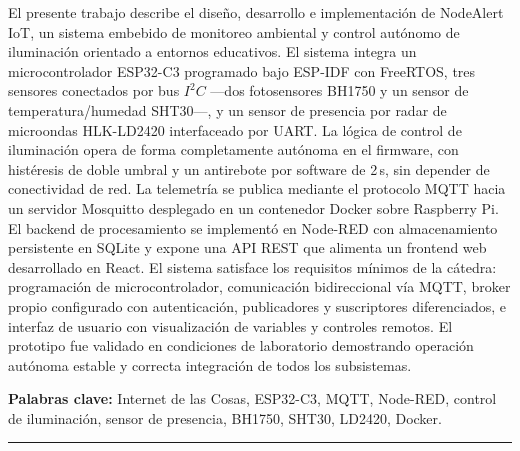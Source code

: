 

\noindent
El presente trabajo describe el diseño, desarrollo e implementación de NodeAlert IoT,
un sistema embebido de monitoreo ambiental y control autónomo de iluminación orientado
a entornos educativos. El sistema integra un microcontrolador ESP32-C3 programado bajo
ESP-IDF con FreeRTOS, tres sensores conectados por bus \(I^2C\) —dos fotosensores BH1750
y un sensor de temperatura/humedad SHT30—, y un sensor de presencia por radar de
microondas HLK-LD2420 interfaceado por UART. La lógica de control de iluminación
opera de forma completamente autónoma en el firmware, con histéresis de doble umbral
y un antirebote por software de 2\,s, sin depender de conectividad de red. La
telemetría se publica mediante el protocolo MQTT hacia un servidor Mosquitto
desplegado en un contenedor Docker sobre Raspberry Pi. El backend de procesamiento
se implementó en Node-RED con almacenamiento persistente en SQLite y expone una API
REST que alimenta un frontend web desarrollado en React. El sistema satisface los
requisitos mínimos de la cátedra: programación de microcontrolador,
comunicación bidireccional vía MQTT, broker propio
configurado con autenticación, publicadores y suscriptores diferenciados, e interfaz
de usuario con visualización de variables y controles remotos. El prototipo fue
validado en condiciones de laboratorio demostrando operación autónoma estable y
correcta integración de todos los subsistemas.

\vspace{10pt}
\noindent\textbf{Palabras clave:} Internet de las Cosas, ESP32-C3, MQTT, Node-RED,
control de iluminación, sensor de presencia, BH1750, SHT30, LD2420, Docker.

\vspace{20pt}
\hrule
\vspace{10pt}


